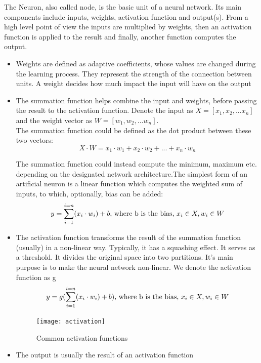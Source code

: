 The Neuron, also called node, is the basic unit of a neural network. Its main components include inputs,
weights, activation function and output(s). From a high level point of view the inputs are multiplied by 
weights, then an activation function is applied to the result and finally, another function computes the output\cite{REF:12}\cite{REF:13}. \par


\begin{itemize}
	\item Weights are defined as adaptive coefficients, whose values are changed during the learning process. They represent the strength of the connection between units. A weight decides how much impact the input will have on the output
	
	\item The summation function helps combine the input and weights, before passing the result to the activation function. Denote the input as $X = [x_1, x_2, ...x_n]$ and the weight vector as $W = [w_1, w_2, ...w_n]$.\\
	The summation function could be defined as the dot product between these two vectors:\\
	\begin{equation}
	X \cdot W =x_1 \cdot w_1 +x_2 \cdot w_2 +...+x_n \cdot w_n
	\end{equation}

	
	The summation function could instead compute the minimum, maximum etc. depending on the designated network architecture.The simplest form of an artificial neuron is a linear function which computes the weighted sum of inputs, to which, optionally, bias can be added:
	\begin{equation}
		y = \sum_{i=1}^{i=n}(x_i \cdot w_i) + b \textnormal{, where b is the bias, $x_i \in X, w_i \in W$}
	\end{equation}

	
	\item The activation function transforms the result of the summation function (usually) in a non-linear way. Typically, it has a squashing effect. It serves as a threshold. It divides the original space into two partitions. It's main purpose is to make the neural network non-linear. We denote the activation function as g
	\begin{equation}
		y = g(\sum_{i=1}^{i=n}(x_i \cdot w_i) + b) \textnormal{, where b is the bias, $x_i \in X, w_i \in W$}
	\end{equation}

	
	\begin{figure}[h]
		\caption[Common activation functions]{Common activation functions \cite{activation_fig} }
		\centering
		\texttt{[image: activation]}
	\end{figure}
	\item The output is usually the result of an activation function
	
\end{itemize}

